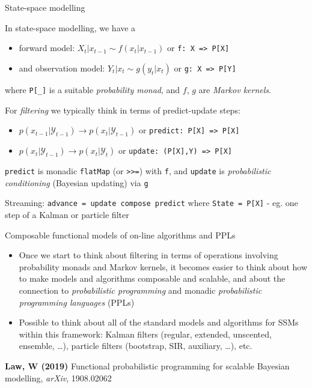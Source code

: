 \begin{frame}[fragile]{State-space modelling}
\protect\hypertarget{state-space-modelling}{}

In state-space modelling, we have a

\begin{itemize}
\tightlist
\item
  forward model: \(X_t | x_{t-1} \sim f(x_t|x_{t-1})\) or
  \texttt{f:\ X\ =\textgreater{}\ P{[}X{]}}
\item
  and observation model: \(Y_t|x_t \sim g(y_t|x_t)\) or
  \texttt{g:\ X\ =\textgreater{}\ P{[}Y{]}}
\end{itemize}

where \texttt{P{[}\_{]}} is a suitable \emph{probability monad}, and
\(f\), \(g\) are \emph{Markov kernels}.

For \emph{filtering} we typically think in terms of predict-update
steps:

\begin{itemize}
\tightlist
\item
  \(p(x_{t-1}|\mathcal{Y}_{t-1}) \rightarrow p(x_t|\mathcal{Y}_{t-1})\)
  or \texttt{predict:\ P{[}X{]}\ =\textgreater{}\ P{[}X{]}}
\item
  \(p(x_t|\mathcal{Y}_{t-1}) \rightarrow p(x_t|\mathcal{Y}_t)\) or
  \texttt{update:\ (P{[}X{]},Y)\ =\textgreater{}\ P{[}X{]}}
\end{itemize}

\texttt{predict} is monadic \texttt{flatMap} (or
\texttt{\textgreater{}\textgreater{}=}) with \texttt{f}, and
\texttt{update} is \emph{probabilistic conditioning} (Bayesian updating)
via \texttt{g}

Streaming:
\texttt{advance\ =\ update\ compose\ predict\textquotesingle{}} where
\texttt{State\ =\ P{[}X{]}} - eg. one step of a Kalman or particle
filter

\end{frame}

\begin{frame}{Composable functional models of on-line algorithms and
PPLs}
\protect\hypertarget{composable-functional-models-of-on-line-algorithms-and-ppls}{}

\begin{itemize}
\item
  Once we start to think about filtering in terms of operations
  involving probability monads and Markov kernels, it becomes easier to
  think about how to make models and algorithms composable and scalable,
  and about the connection to \emph{probabilistic programming} and
  monadic \emph{probabilistic programming languages} (PPLs)
\item
  Possible to think about all of the standard models and algorithms for
  SSMs within this framework: Kalman filters (regular, extended,
  unscented, ensemble, \ldots{}), particle filters (bootstrap, SIR,
  auxiliary, \ldots{}), etc.
\end{itemize}

\textbf{Law, W (2019)} Functional probabilistic programming for scalable
Bayesian modelling, \emph{arXiv}, 1908.02062

\end{frame}

